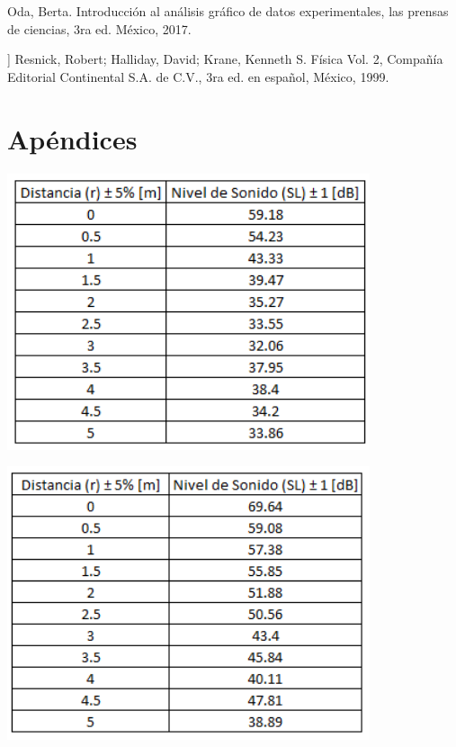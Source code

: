 \documentclass[DIV=calc, paper=a4, fontsize=11pt]{scrartcl}
\newenvironment{Figura}
  {\par\medskip\noindent\minipage{\linewidth}}
  {\endminipage\par\medskip}
\begin{document}
\begin{multicols}{2}
\begin{thebibliography}{99}
 Oda, Berta. Introducción al análisis gráfico de datos experimentales, las prensas de ciencias, 3ra ed. México, 2017.

 ] Resnick, Robert; Halliday, David; Krane, Kenneth S. Física Vol. 2, Compañía Editorial Continental S.A. de C.V., 3ra ed. en español, México,
1999.



\end{thebibliography}

\section*{Apéndices}

\begin{Figura}
\centering
    \includegraphics[width=0.8\textwidth]{tabla 100 Hz.PNG}
    \label{fig}
\end{Figura}


\begin{Figura}
\centering
    \includegraphics[width=0.8\textwidth]{tabla 200 Hz.PNG}
    \label{fig}
\end{Figura}



\end{multicols}
\end{document}
